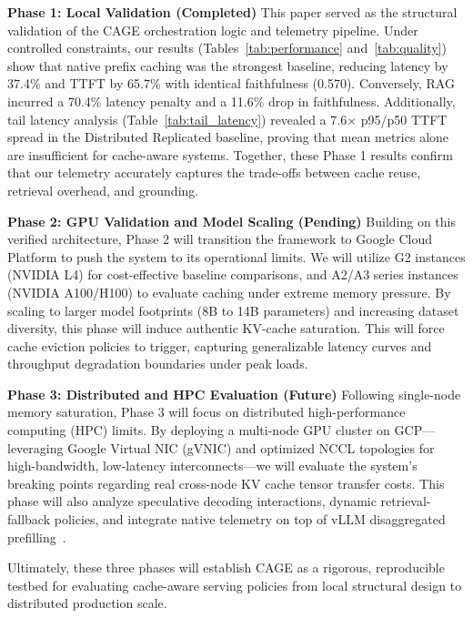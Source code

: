 \documentclass[12pt,a4paper]{article}
\let\cite\citep
\begin{document}
\textbf{Phase 1: Local Validation (Completed)}
This paper served as the structural validation of the CAGE orchestration logic and telemetry pipeline. Under controlled constraints, our results (Tables~\ref{tab:performance} and~\ref{tab:quality}) show that native prefix caching was the strongest baseline, reducing latency by 37.4\% and TTFT by 65.7\% with identical faithfulness (0.570). Conversely, RAG incurred a 70.4\% latency penalty and a 11.6\% drop in faithfulness. Additionally, tail latency analysis (Table~\ref{tab:tail_latency}) revealed a 7.6$\times$ p95/p50 TTFT spread in the Distributed Replicated baseline, proving that mean metrics alone are insufficient for cache-aware systems. Together, these Phase 1 results confirm that our telemetry accurately captures the trade-offs between cache reuse, retrieval overhead, and grounding.

\textbf{Phase 2: GPU Validation and Model Scaling (Pending)}
Building on this verified architecture, Phase 2 will transition the framework to Google Cloud Platform to push the system to its operational limits. We will utilize G2 instances (NVIDIA L4) for cost-effective baseline comparisons, and A2/A3 series instances (NVIDIA A100/H100) to evaluate caching under extreme memory pressure. By scaling to larger model footprints (8B to 14B parameters) and increasing dataset diversity, this phase will induce authentic KV-cache saturation. This will force cache eviction policies to trigger, capturing generalizable latency curves and throughput degradation boundaries under peak loads.

\textbf{Phase 3: Distributed and HPC Evaluation (Future)}
Following single-node memory saturation, Phase 3 will focus on distributed high-performance computing (HPC) limits. By deploying a multi-node GPU cluster on GCP—leveraging Google Virtual NIC (gVNIC) and optimized NCCL topologies for high-bandwidth, low-latency interconnects—we will evaluate the system's breaking points regarding real cross-node KV cache tensor transfer costs. This phase will also analyze speculative decoding interactions, dynamic retrieval-fallback policies, and integrate native telemetry on top of vLLM disaggregated prefilling~\cite{vllm2024disagg}.

Ultimately, these three phases will establish CAGE as a rigorous, reproducible testbed for evaluating cache-aware serving policies from local structural design to distributed production scale.
\end{document}
